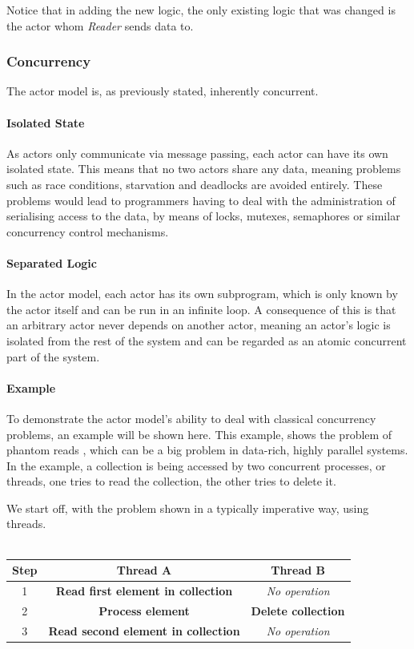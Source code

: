 Notice that in adding the new logic, the only existing logic that was changed is the actor whom \emph{Reader} sends data to.

\subsubsection{Concurrency}
The actor model is, as previously stated, inherently concurrent.

\paragraph{Isolated State}
As actors only communicate via message passing, each actor can have its own isolated state. This means that no two actors share any data, meaning problems such as race conditions, starvation and deadlocks are avoided entirely. These problems would lead to programmers having to deal with the administration of serialising access to the data, by means of locks, mutexes, semaphores or similar concurrency control mechanisms.

\paragraph{Separated Logic}
In the actor model, each actor has its own subprogram, which is only known by the actor itself and can be run in an infinite loop. A consequence of this is that an arbitrary actor never depends on another actor, meaning an actor's logic is isolated from the rest of the system and can be regarded as an atomic concurrent part of the system.

\paragraph{Example}
To demonstrate the actor model's ability to deal with classical concurrency problems, an example will be shown here. This example, shows the problem of phantom reads , which can be a big problem in data-rich, highly parallel systems. In the example, a collection is being accessed by two concurrent processes, or threads, one tries to read the collection, the other tries to delete it.

We start off, with the problem shown in a typically imperative way, using threads.\\\\
%
\begin{tabular}{ | c | c | c | }
\hline
Step & Thread A & Thread B \\\hline
1 & \textbf{Read first element in collection} & \textit{No operation} \\\hline
2 & \textbf{Process element} & \textbf{Delete collection}\\\hline
3 & \textbf{\color{red} Read second element in collection} & \textit{No operation}\\\hline
\end{tabular}\\

